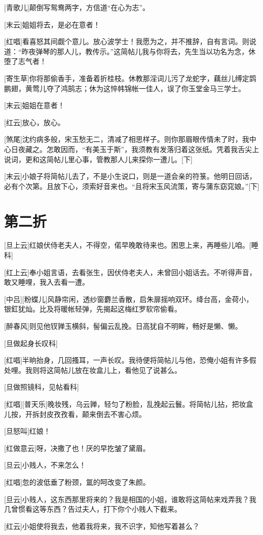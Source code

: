 \documentclass{book}
\newcommand\nchapter[1]{\chapter*{#1}\markboth{#1}{}\addcontentsline{toc}{chapter}{#1}}
\begin{document}
[青歌儿]颠倒写鸳鸯两字，方信道``在心为志''。

[末云]姐姐将去，是必在意者！

[红唱]看喜怒其间觑个意儿。放心波学士！我愿为之，并不推辞，自有言词。则说道：``昨夜弹琴的那人儿，教传示。''这简帖儿我与你将去，先生当以功名为念，休堕了志气者！

[寄生草]你将那偷香手，准备着折桂枝。休教那淫词儿污了龙蛇字，藕丝儿缚定鹍鹏翅，黄莺儿夺了鸿鹄志；休为这悴帏锦帐一佳人，误了你玉堂金马三学士。

[末云]姐姐在意者！

[红云]放心，放心。

[煞尾]沈约病多般，宋玉愁无二，清减了相思样子。则你那眉眼传情未了时，我中心日夜藏之。怎敢因而，``有美玉于斯''，我须教有发落归着这张纸。凭着我舌尖上说词，更和这简帖儿里心事，管教那人儿来探你一遭儿。[下]

[末云]小娘子将简帖儿去了，不是小生说口，则是一道会亲的符箓。他明日回话，必有个次第。且放下心，须索好音来也。``且将宋玉风流策，寄与蒲东窈窕娘。''[下]

\nchapter{第二折}

[旦上云]红娘伏侍老夫人，不得空，偌早晚敢待来也。困思上来，再睡些儿咱。[睡科]

[红上云]奉小姐言语，去看张生，因伏侍老夫人，未曾回小姐话去。不听得声音，敢又睡哩，我入去看一遭。

[中吕][粉蝶儿]风静帘闲，透纱窗麝兰香散，启朱扉摇响双环。绛台高，金荷小，银釭犹灿。比及将暖帐轻弹，先揭起这梅红罗软帘偷看。

[醉春风]则见他钗亸玉横斜，髻偏云乱挽。日高犹自不明眸，畅好是懒、懒。

[旦做起身长叹科]

[红唱]半晌抬身，几回搔耳，一声长叹。我待便将简帖儿与他，恐俺小姐有许多假处哩。我则将这简帖儿放在妆盒儿上，看他见了说甚么。

[旦做照镜科，见帖看科]

[红唱][普天乐]晚妆残，乌云亸，轻匀了粉脸，乱挽起云鬟。将简帖儿拈，把妆盒儿按，开拆封皮孜孜看，颠来倒去不害心烦。

[旦怒叫]红娘！

[红做意云]呀，决撒了也！厌的早扢皱了黛眉。

[旦云]小贱人，不来怎么！

[红唱]忽的波低垂了粉颈，氲的呵改变了朱颜。

[旦云]小贱人，这东西那里将来的？我是相国的小姐，谁敢将这简帖来戏弄我？我几曾惯看这等东西？告过夫人，打下你个小贱人下截来。

[红云]小姐使将我去，他着我将来，我不识字，知他写着甚么？
\end{document}

